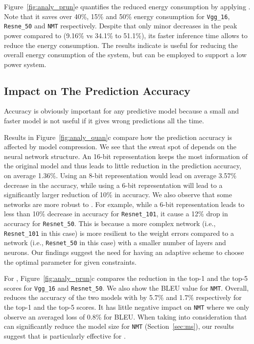 Figure~\ref{fig:analy_prun}e quantifies the reduced energy consumption by applying \pruning. Note that it saves over 40\%, 15\% and 50\%
energy consumption for \texttt{Vgg\_16}, \texttt{Resne\_50} and \texttt{NMT} respectively. Despite that only minor decreases in the peak
power compared to \quantization (9.16\% vs 34.1\% to 51.1\%), its faster inference time allows \pruning to reduce the energy consumption.
The results indicate \pruning is useful for reducing the overall energy consumption of the system, but \quantization can be employed to
support a low power system.

\subsection{Impact on The Prediction Accuracy}
Accuracy is obviously important for any predictive model because a small and faster model is not useful if it gives wrong predictions all
the time.


Results in Figure~\ref{fig:analy_quan}c compare how the prediction accuracy is affected by model compression. We see that the sweat spot of
\quantization depends on the neural network structure. An 16-bit representation keeps the most information of the original model and thus
leads to little reduction in the prediction accuracy, on average  1.36\%.  Using an 8-bit representation would lead on average 3.57\%
decrease in the accuracy, while using a 6-bit representation will lead to a significantly larger reduction of 10\% in  accuracy. We also
observe that some networks are more robust to \quantization. For example, while a 6-bit representation leads to less than 10\% decrease in
accuracy for \texttt{Resnet\_101}, it cause a 12\% drop in accuracy for \texttt{Resnet\_50}. This is because a more complex network (i.e.,
\texttt{Resnet\_101} in this case) is more resilient to the weight errors compared to a network (i.e., \texttt{Resnet\_50} in this case)
with a smaller number of layers and neurons. Our findings suggest the need for having an adaptive scheme to choose the optimal
\dquantization parameter for given constraints.


For \pruning, Figure~\ref{fig:analy_prun}c compares the reduction in the top-1 and the top-5 scores for \texttt{Vgg\_16} and
\texttt{Resnet\_50}. We also show the BLEU value for \texttt{NMT}. Overall, \pruning reduces the accuracy of the two \CNN models with by
5.7\% and 1.7\% respectively for the top-1 and the top-5 scores. It has little negative impact on \texttt{NMT} where we only observe an
averaged loss of 0.8\% for BLEU. When taking into consideration that \pruning can significantly reduce the model size for \texttt{NMT}
(Section~\ref{sec:ms}), our results suggest that \pruning is particularly effective for \RNNs.

